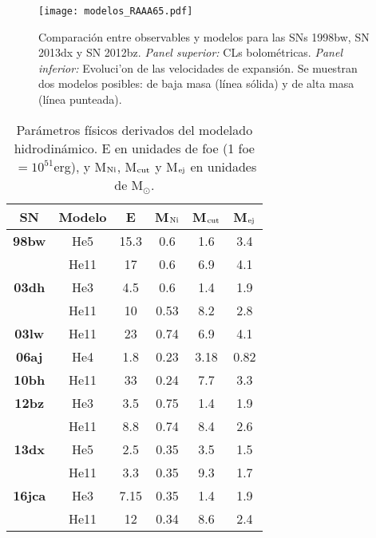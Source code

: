 \documentclass[baaa]{baaa}
\begin{document}
\begin{figure}[h!]
    \centering
    \texttt{[image: modelos\_RAAA65.pdf]}\vspace{-1cm}
    \caption{Comparaci\'on entre observables y modelos para las SNs 1998bw, SN 2013dx y SN 2012bz. \textit{Panel superior:} CLs bolom\'etricas. \textit{Panel inferior:} Evoluci'on de las velocidades de expansi\'on. Se muestran dos modelos posibles: de baja masa (l\'inea s\'olida) y de alta masa (l\'inea punteada).}
    \label{fig:modelos}
\end{figure}


\begin{table}
\centering
\begin{center}
\caption{Parámetros físicos derivados del modelado hidrodinámico. E en unidades de foe (1 foe$\,=10^{51}$erg), y M$_{\rm{Ni}}$, M$_{\rm{cut}}$ y M$_{\rm{ej}}$ en unidades de M$_\odot$.}
{\renewcommand{\arraystretch}{1.3}
\begin{tabular}{cccccc}
\hline
\hline
\textbf{SN} & \textbf{Modelo} & \textbf{E} & \textbf{M$_{\rm{Ni}}$} & \textbf{M$_{\rm{cut}}$} & \textbf{M$_{\rm{ej}}$}  \\
\hline
{\textbf{98bw}} & He5 & 15.3 & {0.6} &  1.6 & 3.4 \\
 & He11 & 17 &  0.6 &  6.9 & 4.1 \\
\hline
\textbf{03dh} & He3 & 4.5 & 0.6 &  1.4 &  1.9 \\
 & He11 & 10 & 0.53 & 8.2 & 2.8 \\
\hline
\textbf{03lw} & He11 & 23 & 0.74 &  6.9  & 4.1   \\
\hline
\textbf{06aj} & He4 & 1.8 & 0.23  & 3.18 & 0.82 \\
\hline
\textbf{10bh} & He11 & 33 & 0.24  & 7.7 & 3.3 \\
\hline
\textbf{12bz} & He3 & 3.5 & 0.75 & 1.4 & 1.9 \\
 & He11 & 8.8 &  0.74 & 8.4 & 2.6\\
\hline
\textbf{13dx} & He5 & 2.5 & 0.35 &  3.5 & 1.5 \\
 & He11 & 3.3 & 0.35 & 9.3 & 1.7 \\
\hline
\textbf{16jca} & He3 & 7.15 & 0.35  & 1.4 & 1.9 \\
 & He11 & 12 & 0.34 &  8.6 & 2.4 \\
\hline
\end{tabular}}\label{table:best_param}
\end{center}
\end{table}
\end{document}
